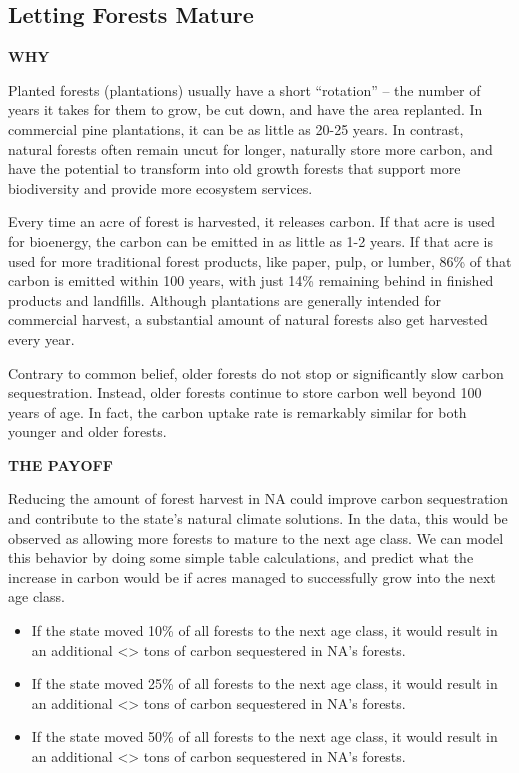 \documentclass[
]{article}
\begin{document}
\hypertarget{letting-forests-mature}{%
\subsection{Letting Forests Mature}\label{letting-forests-mature}}

\textbf{WHY}

Planted forests (plantations) usually have a short ``rotation'' -- the
number of years it takes for them to grow, be cut down, and have the
area replanted. In commercial pine plantations, it can be as little as
20-25 years. In contrast, natural forests often remain uncut for longer,
naturally store more carbon, and have the potential to transform into
old growth forests that support more biodiversity and provide more
ecosystem services.

Every time an acre of forest is harvested, it releases carbon. If that
acre is used for bioenergy, the carbon can be emitted in as little as
1-2 years. If that acre is used for more traditional forest products,
like paper, pulp, or lumber, 86\% of that carbon is emitted within 100
years, with just 14\% remaining behind in finished products and
landfills. Although plantations are generally intended for commercial
harvest, a substantial amount of natural forests also get harvested
every year.

Contrary to common belief, older forests do not stop or significantly
slow carbon sequestration. Instead, older forests continue to store
carbon well beyond 100 years of age. In fact, the carbon uptake rate is
remarkably similar for both younger and older forests.

\textbf{THE PAYOFF}

Reducing the amount of forest harvest in NA could improve carbon
sequestration and contribute to the state's natural climate solutions.
In the data, this would be observed as allowing more forests to mature
to the next age class. We can model this behavior by doing some simple
table calculations, and predict what the increase in carbon would be if
acres managed to successfully grow into the next age class.

\begin{itemize}
\item
  If the state moved 10\% of all forests to the next age class, it would
  result in an additional \textless{}\textgreater{} tons of carbon
  sequestered in NA's forests.
\item
  If the state moved 25\% of all forests to the next age class, it would
  result in an additional \textless{}\textgreater{} tons of carbon
  sequestered in NA's forests.
\item
  If the state moved 50\% of all forests to the next age class, it would
  result in an additional \textless{}\textgreater{} tons of carbon
  sequestered in NA's forests.
\end{itemize}
\end{document}
